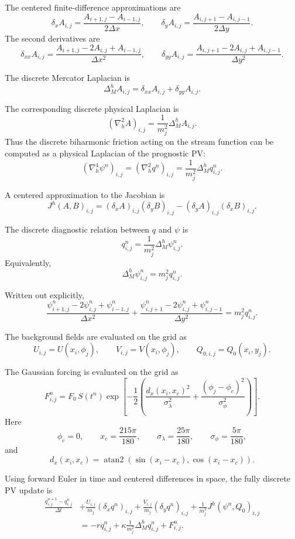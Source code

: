 \documentclass[11pt]{article}
\begin{document}
The centered finite-difference approximations are
\[
\delta_x A_{i,j}
=
\frac{A_{i+1,j}-A_{i-1,j}}{2\Delta x},
\qquad
\delta_y A_{i,j}
=
\frac{A_{i,j+1}-A_{i,j-1}}{2\Delta y}.
\]
The second derivatives are
\[
\delta_{xx}A_{i,j}
=
\frac{A_{i+1,j}-2A_{i,j}+A_{i-1,j}}{\Delta x^2},
\qquad
\delta_{yy}A_{i,j}
=
\frac{A_{i,j+1}-2A_{i,j}+A_{i,j-1}}{\Delta y^2}.
\]

The discrete Mercator Laplacian is
\[
\Delta_M^h A_{i,j}
=
\delta_{xx}A_{i,j}
+
\delta_{yy}A_{i,j}.
\]

The corresponding discrete physical Laplacian is
\[
(\nabla_h^2 A)_{i,j}
=
\frac{1}{m_j^2}
\Delta_M^h A_{i,j}.
\]
Thus the discrete biharmonic friction acting on the stream function can be
computed as a physical Laplacian of the prognostic PV:
\[
(\nabla_h^4\psi^n)_{i,j}
=
(\nabla_h^2 q^n)_{i,j}
=
\frac{1}{m_j^2}
\Delta_M^h q_{i,j}^n.
\]

A centered approximation to the Jacobian is
\[
J^h(A,B)_{i,j}
=
(\delta_x A)_{i,j}(\delta_y B)_{i,j}
-
(\delta_y A)_{i,j}(\delta_x B)_{i,j}.
\]

The discrete diagnostic relation between \(q\) and \(\psi\) is
\[
\boxed{
q_{i,j}^n
=
\frac{1}{m_j^2}
\Delta_M^h \psi_{i,j}^n .
}
\]
Equivalently,
\[
\boxed{
\Delta_M^h \psi_{i,j}^n
=
m_j^2 q_{i,j}^n .
}
\]

Written out explicitly,
\[
\boxed{
\frac{\psi_{i+1,j}^n-2\psi_{i,j}^n+\psi_{i-1,j}^n}{\Delta x^2}
+
\frac{\psi_{i,j+1}^n-2\psi_{i,j}^n+\psi_{i,j-1}^n}{\Delta y^2}
=
m_j^2 q_{i,j}^n .
}
\]

The background fields are evaluated on the grid as
\[
U_{i,j}=U(x_i,\phi_j),
\qquad
V_{i,j}=V(x_i,\phi_j),
\qquad
Q_{0,i,j}=Q_0(x_i,y_j).
\]

The Gaussian forcing is evaluated on the grid as
\[
\boxed{
F_{i,j}^n
=
F_0\,S(t^n)
\exp
\left[
-\frac{1}{2}
\left(
\frac{d_x(x_i,x_c)^2}{\sigma_\lambda^2}
+
\frac{(\phi_j-\phi_c)^2}{\sigma_\phi^2}
\right)
\right].
}
\]
Here
\[
\phi_c=0,
\qquad
x_c=\frac{215\pi}{180},
\qquad
\sigma_\lambda=\frac{25\pi}{180},
\qquad
\sigma_\phi=\frac{5\pi}{180},
\]
and
\[
d_x(x_i,x_c)
=
\operatorname{atan2}
\left(
\sin(x_i-x_c),
\cos(x_i-x_c)
\right).
\]

Using forward Euler in time and centered differences in space, the fully discrete
PV update is
\[
\boxed{
\begin{aligned}
\frac{q_{i,j}^{n+1}-q_{i,j}^{n}}{\Delta t}
&+
\frac{U_{i,j}}{m_j}
(\delta_x q^n)_{i,j}
+
\frac{V_{i,j}}{m_j}
(\delta_y q^n)_{i,j}
+
\frac{1}{m_j^2}
J^h(\psi^n,Q_0)_{i,j}
\\
&=
-r q_{i,j}^{n}
+
\kappa
\frac{1}{m_j^2}
\Delta_M^h q_{i,j}^{n}
+
F_{i,j}^{n}.
\end{aligned}
}
\]
\end{document}
